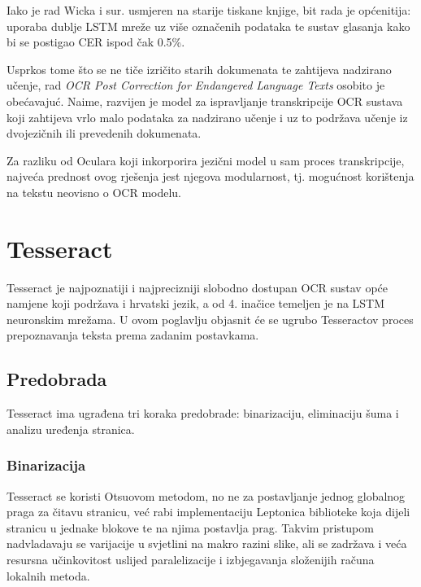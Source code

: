\documentclass[zavrsnirad]{fer}
\begin{document}
Iako je rad Wicka i sur. \cite{Wick2018} usmjeren na starije tiskane knjige, bit rada je općenitija: uporaba dublje LSTM mreže uz više označenih podataka te sustav glasanja kako bi se postigao CER ispod čak 0.5\%.

Usprkos tome što se ne tiče izričito starih dokumenata te zahtijeva nadzirano učenje, rad \textit{OCR Post Correction for Endangered Language Texts} \cite{Rijhwani2022} osobito je obećavajuć. Naime, razvijen je model za ispravljanje transkripcije OCR sustava koji zahtijeva vrlo malo podataka za nadzirano učenje i uz to podržava učenje iz dvojezičnih ili prevedenih dokumenata. 

Za razliku od Oculara koji inkorporira jezični model u sam proces transkripcije, najveća prednost ovog rješenja jest njegova modularnost, tj. mogućnost korištenja na tekstu neovisno o OCR modelu.



\chapter{Tesseract}
\label{pog:tesseract}

Tesseract \cite{Smith2007} je najpoznatiji i najprecizniji slobodno dostupan OCR sustav opće namjene koji podržava i hrvatski jezik, a od 4. inačice temeljen je na LSTM neuronskim mrežama. U ovom poglavlju objasnit će se ugrubo Tesseractov proces prepoznavanja teksta prema zadanim postavkama.

\section{Predobrada}

Tesseract ima ugrađena tri koraka predobrade: binarizaciju, eliminaciju šuma i analizu uređenja stranica.

\subsection{Binarizacija}

Tesseract se koristi Otsuovom metodom, no ne za postavljanje jednog globalnog praga za čitavu stranicu, već rabi implementaciju Leptonica biblioteke \cite{Leptonica} koja dijeli stranicu u jednake blokove te na njima postavlja prag. Takvim pristupom nadvladavaju se varijacije u svjetlini na makro razini slike, ali se zadržava i veća resursna učinkovitost uslijed paralelizacije i izbjegavanja složenijih računa lokalnih metoda.
\end{document}
